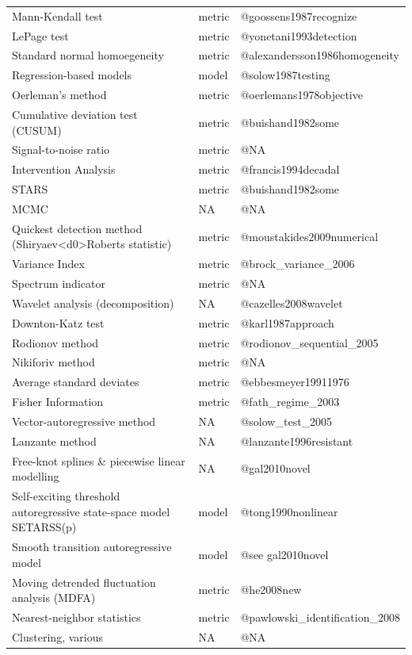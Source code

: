 \documentclass[12pt,twoside,openany]{reedthesis}
\begin{document}
\begin{longtable}{lll}
Mann-Kendall test & metric & @goossens1987recognize\\
LePage test & metric & @yonetani1993detection\\
Standard normal homoegeneity & metric & @alexandersson1986homogeneity\\
\addlinespace
Regression-based models & model & @solow1987testing\\
Oerleman's method & metric & @oerlemans1978objective\\
Cumulative deviation test (CUSUM) & metric & @buishand1982some\\
Signal-to-noise ratio & metric & @NA\\
Intervention Analysis & metric & @francis1994decadal\\
\addlinespace
STARS & metric & @buishand1982some\\
MCMC & NA & @NA\\
Quickest detection method (Shiryaev<d0>Roberts statistic) & metric & @moustakides2009numerical\\
Variance Index & metric & @brock\_variance\_2006\\
Spectrum indicator & metric & @NA\\
\addlinespace
Wavelet analysis (decomposition) & NA & @cazelles2008wavelet\\
Downton-Katz test & metric & @karl1987approach\\
Rodionov method & metric & @rodionov\_sequential\_2005\\
Nikiforiv method & metric & @NA\\
Average standard deviates & metric & @ebbesmeyer19911976\\
\addlinespace
Fisher Information & metric & @fath\_regime\_2003\\
Vector-autoregressive method & NA & @solow\_test\_2005\\
Lanzante method & NA & @lanzante1996resistant\\
Free-knot splines \& piecewise linear modelling & NA & @gal2010novel\\
Self-exciting threshold autoregressive state-space model SETARSS(p) & model & @tong1990nonlinear\\
\addlinespace
Smooth transition autoregressive model & model & @see gal2010novel\\
Moving detrended fluctuation analysis (MDFA) & metric & @he2008new\\
Nearest-neighbor statistics & metric & @pawlowski\_identification\_2008\\
Clustering, various & NA & @NA\\

\end{longtable}
\end{document}
